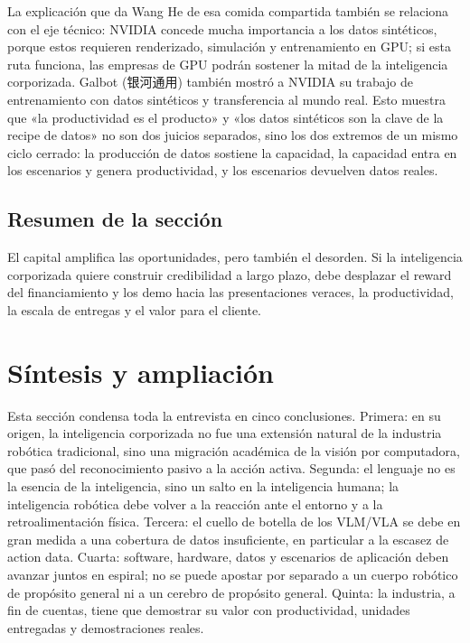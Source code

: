 \documentclass[a4paper]{article}
\begin{document}
La explicación que da Wang He de esa comida compartida también se relaciona con el eje técnico: NVIDIA concede mucha importancia a los datos sintéticos, porque estos requieren renderizado, simulación y entrenamiento en GPU; si esta ruta funciona, las empresas de GPU podrán sostener la mitad de la inteligencia corporizada. Galbot (银河通用) también mostró a NVIDIA su trabajo de entrenamiento con datos sintéticos y transferencia al mundo real. Esto muestra que «la productividad es el producto» y «los datos sintéticos son la clave de la recipe de datos» no son dos juicios separados, sino los dos extremos de un mismo ciclo cerrado: la producción de datos sostiene la capacidad, la capacidad entra en los escenarios y genera productividad, y los escenarios devuelven datos reales.

\subsection{Resumen de la sección}

El capital amplifica las oportunidades, pero también el desorden. Si la inteligencia corporizada quiere construir credibilidad a largo plazo, debe desplazar el reward del financiamiento y los demo hacia las presentaciones veraces, la productividad, la escala de entregas y el valor para el cliente.
\section{Síntesis y ampliación}

Esta sección condensa toda la entrevista en cinco conclusiones. Primera: en su origen, la inteligencia corporizada no fue una extensión natural de la industria robótica tradicional, sino una migración académica de la visión por computadora, que pasó del reconocimiento pasivo a la acción activa. Segunda: el lenguaje no es la esencia de la inteligencia, sino un salto en la inteligencia humana; la inteligencia robótica debe volver a la reacción ante el entorno y a la retroalimentación física. Tercera: el cuello de botella de los VLM/VLA se debe en gran medida a una cobertura de datos insuficiente, en particular a la escasez de action data. Cuarta: software, hardware, datos y escenarios de aplicación deben avanzar juntos en espiral; no se puede apostar por separado a un cuerpo robótico de propósito general ni a un cerebro de propósito general. Quinta: la industria, a fin de cuentas, tiene que demostrar su valor con productividad, unidades entregadas y demostraciones reales.
\end{document}
